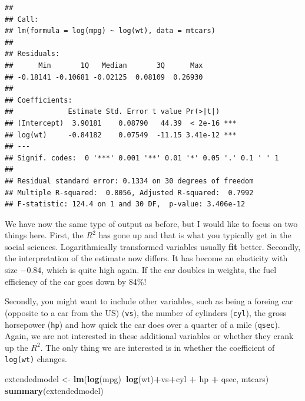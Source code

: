 \documentclass[]{article}
\newenvironment{Shaded}{\begin{snugshade}}{\end{snugshade}}
\newcommand{\KeywordTok}[1]{\textcolor[rgb]{0.13,0.29,0.53}{\textbf{#1}}}
\newcommand{\StringTok}[1]{\textcolor[rgb]{0.31,0.60,0.02}{#1}}
\newcommand{\OperatorTok}[1]{\textcolor[rgb]{0.81,0.36,0.00}{\textbf{#1}}}
\newcommand{\NormalTok}[1]{#1}
\theoremstyle{definition}
\theoremstyle{definition}
\theoremstyle{definition}
\theoremstyle{remark}
\begin{document}
\begin{verbatim}
## 
## Call:
## lm(formula = log(mpg) ~ log(wt), data = mtcars)
## 
## Residuals:
##      Min       1Q   Median       3Q      Max 
## -0.18141 -0.10681 -0.02125  0.08109  0.26930 
## 
## Coefficients:
##             Estimate Std. Error t value Pr(>|t|)    
## (Intercept)  3.90181    0.08790   44.39  < 2e-16 ***
## log(wt)     -0.84182    0.07549  -11.15 3.41e-12 ***
## ---
## Signif. codes:  0 '***' 0.001 '**' 0.01 '*' 0.05 '.' 0.1 ' ' 1
## 
## Residual standard error: 0.1334 on 30 degrees of freedom
## Multiple R-squared:  0.8056, Adjusted R-squared:  0.7992 
## F-statistic: 124.4 on 1 and 30 DF,  p-value: 3.406e-12
\end{verbatim}

We have now the same type of output as before, but I would like to focus
on two things here. First, the \(R^2\) has gone up and that is what you
typically get in the social sciences. Logarithmically transformed
variables usually \textbf{fit} better. Secondly, the interpretation of
the estimate now differs. It has become an elasticity with size
\(-0.84\), which is quite high again. If the car doubles in weights, the
fuel efficiency of the car goes down by 84\%!

Secondly, you might want to include other variables, such as being a
foreing car (opposite to a car from the US) (\texttt{vs}), the number of
cylinders (\texttt{cyl}), the gross horsepower (\texttt{hp}) and how
quick the car does over a quarter of a mile (\texttt{qsec}). Again, we
are not interested in these additional variables or whether they crank
up the \(R^2\). The only thing we are interested is in whether the
coefficient of \texttt{log(wt)} changes.

\begin{Shaded}
\begin{Highlighting}[]
\NormalTok{extendedmodel <-}\StringTok{ }\KeywordTok{lm}\NormalTok{(}\KeywordTok{log}\NormalTok{(mpg)}\OperatorTok{~}\KeywordTok{log}\NormalTok{(wt)}\OperatorTok{+}\NormalTok{vs}\OperatorTok{+}\NormalTok{cyl }\OperatorTok{+}\StringTok{ }\NormalTok{hp }\OperatorTok{+}\StringTok{ }\NormalTok{qsec, mtcars)}
\KeywordTok{summary}\NormalTok{(extendedmodel)}
\end{Highlighting}
\end{Shaded}
\end{document}
